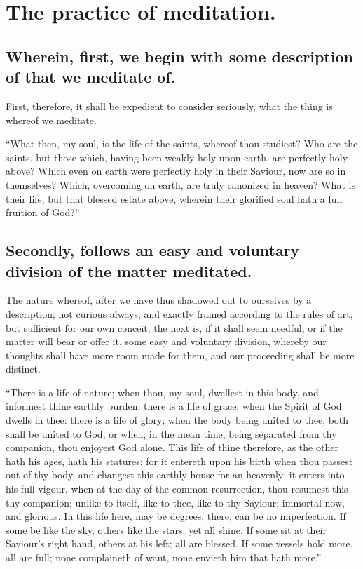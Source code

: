 \chapter{The practice of meditation.} 
\section{Wherein, first, we begin with some description of that we meditate of.}
First, therefore, it shall be expedient to consider seriously, what the thing is whereof we meditate. 

``What then, my soul, is the life of the saints, whereof thou studiest? Who are the saints, but those which, having been weakly holy upon earth, are perfectly holy above? Which even on earth were perfectly holy in their Saviour, now are so in themselves? Which, overcoming on earth, are truly canonized in heaven? What is their life, but that blessed estate above, wherein their glorified soul hath a full fruition of God?'' 

\section{Secondly, follows an easy and voluntary division of the matter meditated.}

The nature whereof, after we have thus shadowed out to ourselves by a description; not curious always, and exactly framed according to the rules of art, but sufficient for our own conceit; the next is, if it shall seem needful, or if the matter will bear or offer it, some easy and voluntary division, whereby our thoughts shall have more room made for them, and our proceeding shall be more distinct. 

``There is a life of nature; when thou, my soul, dwellest in this body, and informest thine earthly burden: there is a life of grace; when the Spirit of God dwells in thee: there is a life of glory; when the body being united to thee, both shall be united to God; or when, in the mean time, being separated from thy companion, thou enjoyest God alone. This life of thine therefore, as the other hath his ages, hath his statures: for it entereth upon his birth when thou passest out of thy body, and changest this earthly house for an heavenly: it enters into his full vigour, when at the day of the common resurrection, thou resumest this thy companion; unlike to itself, like to thee, like to thy Sayiour; immortal now, and glorious. In this life here, may be degrees; there, can be no imperfection. If some be like the sky, others like the stars; yet all shine. If some sit at their Saviour's right hand, others at his left; all are blessed. If some vessels hold more, all are full; none complaineth of want, none envieth him that hath more.''

